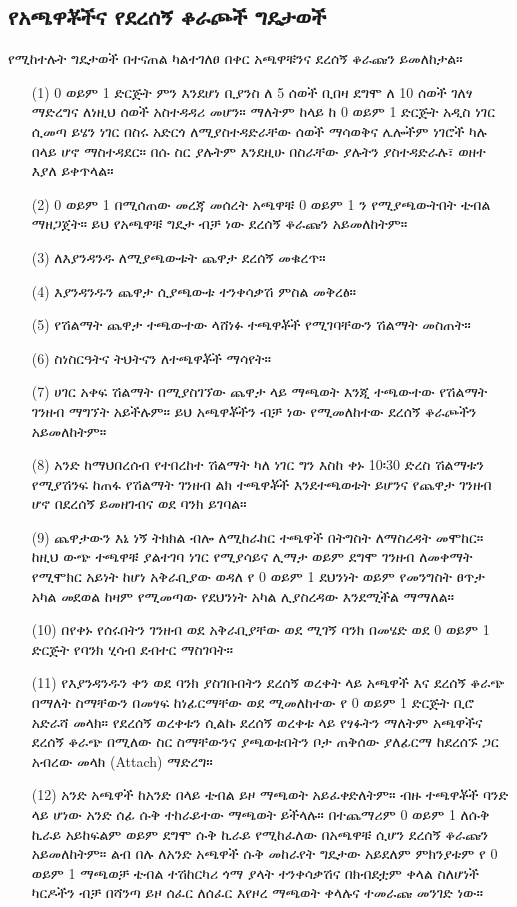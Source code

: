 \documentclass[a4paper,12pt]{article}
\newenvironment{geez}{\geezfont}{}
\begin{document}
\subsection{\begin{geez}የአጫዋቾችና የደረሰኝ ቆራጮች ግዴታወች\end{geez}}
\justify
የሚከተሉት ግዴታወች በተናጠል ካልተገለፀ በቀር አጫዋቹንና ደረሰኝ ቆራጩን ይመለከታል።
\begin{enumerate}
\item[(1)] 0 ወይም 1 ድርጅት ምን እንደሆነ ቢያንስ ለ 5 ሰወች ቢበዛ ደግሞ ለ 10 ሰወች ገለፃ ማድረግና ለነዚህ ሰወች አስተዳዳሪ መሆን። ማለትም ከላይ ከ 0 ወይም 1 ድርጅት አዲስ ነገር ሲመጣ ይሄን ነገር በስሩ አድርጎ ለሚያስተዳድራቸው ሰወች ማሳወቅና ሌሎችም ነገሮች ካሉ በላይ ሆኖ ማስተዳደር። በሱ ስር ያሉትም እንደዚሁ በስራቸው ያሉትን ያስተዳድራሉ፣ ወዘተ እያለ ይቀጥላል። 
\item[(2)] 0 ወይም 1 በሚሰጠው መረጃ መሰረት አጫዋቹ 0 ወይም 1 ን የሚያጫውትበት ቴብል ማዘጋጀት። ይህ የአጫዋቹ ግዴታ ብቻ ነው ደረሰኝ ቆራጩን አይመለከትም።
\item[(3)] ለእያንዳንዱ ለሚያጫውቱት ጨዋታ ደረሰኝ መቁረጥ።
\item[(4)] እያንዳንዱን ጨዋታ ሲያጫውቱ ተንቀሳቃሽ ምስል መቅረፅ።
\item[(5)] የሽልማት ጨዋታ ተጫውተው ላሸነፉ ተጫዋቾች የሚገባቸውን ሽልማት መስጠት።
\item[(6)] ስነስርዓትና ትህትናን ለተጫዋቾች ማሳየት።
\item[(7)] ሀገር አቀፍ ሽልማት በሚያስገኘው ጨዋታ ላይ ማጫወት እንጂ ተጫውተው የሽልማት ገንዘብ ማግኘት አይችሉም። ይህ አጫዋቾችን ብቻ ነው የሚመለከተው ደረሰኝ ቆራጮችን አይመለከትም። 
\item[(8)] አንድ ከማህበረሰብ የተበረከተ ሽልማት ካለ ነገር ግን እስከ ቀኑ 10፡30 ድረስ ሽልማቱን የሚያሽንፍ ከጠፋ የሽልማት ገንዘብ ልክ ተጫዋቾች እንደተጫወቱት ይሆንና የጨዋታ ገንዘብ ሆኖ በደረሰኝ ይመዘገብና ወደ ባንክ ይገባል። 
\item[(9)] ጨዋታውን እኔ ነኝ ትክክል ብሎ ለሚከራከር ተጫዋች በትግስት ለማስረዳት መሞከር። ከዚህ ውጭ ተጫዋቹ ያልተገባ ነገር የሚያሳይና ሊማታ ወይም ደግሞ ገንዘብ ለመቀማት የሚሞክር አይነት ከሆነ አቅራቢያው ወዳለ የ 0 ወይም 1 ደህንነት ወይም የመንግስት ፀጥታ አካል መደወል ከዛም የሚመጣው የደህንነት አካል  ሊያስረዳው እንደሚችል ማማለል።
\item[(10)] በየቀኑ የሰሩበትን ገንዘብ ወደ አቅራቢያቸው ወደ ሚገኝ ባንክ በመሄድ ወደ 0 ወይም 1 ድርጅት የባንክ ሂሳብ ደብተር ማስገባት። 
\item[(11)] የእያንዳንዱን ቀን ወደ ባንክ ያስገቡበትን ደረሰኝ ወረቀት ላይ አጫዋች እና ደረሰኝ ቆራጭ በማለት ስማቸውን በመፃፍ ከነፊርማቸው ወደ ሚመለከተው የ 0 ወይም 1 ድርጅት ቢሮ አድራሻ መላክ። የደረሰኝ ወረቀቱን ሲልኩ ደረሰኝ ወረቀቱ ላይ የፃፉትን ማለትም አጫዋችና ደረሰኝ ቆራጭ በሚለው ስር ስማቸውንና ያጫወቱበትን ቦታ ጠቅሰው ያለፊርማ ከደረሰኙ ጋር አብረው መላክ (Attach) ማድረግ።
\item[(12)]አንድ አጫዋች ከአንድ በላይ ቴብል ይዞ ማጫወት አይፈቀድለትም። ብዙ ተጫዋቾች ባንድ ላይ ሆነው አንድ ሰፊ ሱቅ ተከራይተው ማጫወት ይችላሉ። በተጨማሪም  0 ወይም 1 ለሱቅ ኪራይ አይከፍልም ወይም ደግሞ ሱቅ ኪራይ የሚከፈለው በአጫዋቹ ሲሆን ደረሰኝ ቆራጩን አይመለከትም። ልብ በሉ ለአንድ አጫዋች ሱቅ መከራየት ግዴታው አይደለም ምክንያቱም የ 0 ወይም 1 ማጫወቻ ቴብል ተሽከርካሪ ጎማ ያላት ተንቀሳቃሽና በክብደቷም ቀላል ስለሆነች ካርዶችን ብቻ በሻንጣ ይዞ ሰፈር ለሰፈር እየዞረ ማጫወት ቀላሉና ተመራጩ መንገድ ነው።   
\end{enumerate}
\end{document}
